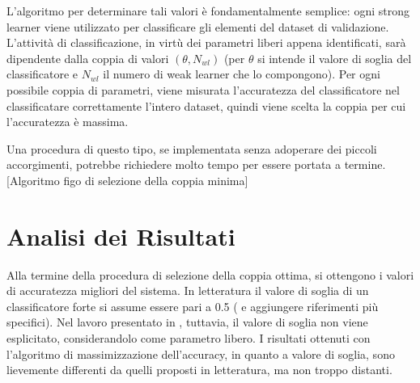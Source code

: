             L'algoritmo per determinare tali valori è fondamentalmente semplice: ogni strong learner viene utilizzato per classificare gli elementi del dataset di validazione.
            L'attività di classificazione, in virtù dei parametri liberi appena identificati, sarà dipendente dalla coppia di valori $(\theta, N_{wl})$ (per $\theta$ si intende il valore di soglia del classificatore e $N_{wl}$ il numero di weak learner che lo compongono).
            Per ogni possibile coppia di parametri, viene misurata l'accuratezza del classificatore nel classificatare correttamente l'intero dataset, quindi viene scelta la coppia per cui l'accuratezza è massima.

            Una procedura di questo tipo, se implementata senza adoperare dei piccoli accorgimenti, potrebbe richiedere molto tempo per essere portata a termine.
            [Algoritmo figo di selezione della coppia minima]

    \section{Analisi dei Risultati} %
    \label{sec:analisi_dei_risultati}
        Alla termine della procedura di selezione della coppia ottima, si ottengono i valori di accuratezza migliori del sistema.
            In letteratura il valore di soglia di un classificatore forte si assume essere pari a 0.5 (\cite{Freund97} e \cite{Viola04} aggiungere riferimenti più specifici). Nel lavoro presentato in \cite{Zhu13}, tuttavia, il valore di soglia non viene esplicitato, considerandolo come parametro libero.
            I risultati ottenuti con l'algoritmo di massimizzazione dell'accuracy, in quanto a valore di soglia, sono lievemente differenti da quelli proposti in letteratura, ma non troppo distanti.

